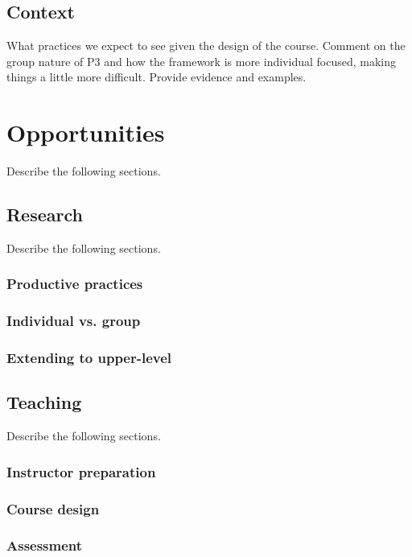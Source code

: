 \documentclass{msuphddissertation}
\begin{document}
\begin{doublespace}
\subsection{Context}\label{CH6:Context}

What practices we expect to see given the design of the course.  Comment on the group nature of P3 and how the framework is more individual focused, making things a little more difficult.  Provide evidence and examples.

\section{Opportunities}

Describe the following sections.

\subsection{Research}

Describe the following sections.

\subsubsection{Productive practices}

\subsubsection{Individual vs. group}

\subsubsection{Extending to upper-level}

\subsection{Teaching}

Describe the following sections.

\subsubsection{Instructor preparation}

\subsubsection{Course design}

\subsubsection{Assessment}


\end{doublespace}
\end{document}
